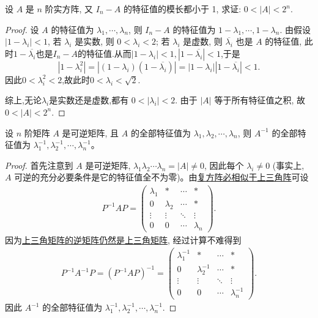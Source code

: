 \documentclass[../../main.tex]{subfiles}
\begin{document}
\begin{example}
设 \( A \) 是 \( n \) 阶实方阵, 又 \( I_n - A \) 的特征值的模长都小于 1, 求证: \( 0 < |A| < 2^n \).
\end{example}
\begin{proof}
设 \( A \) 的特征值为 \( \lambda_1, \cdots, \lambda_n \), 则 \( I_n - A \) 的特征值为 \( 1 - \lambda_1, \cdots, 1 - \lambda_n \).
由假设 \( |1 - \lambda_i| < 1 \), 若 \( \lambda_i \) 是实数, 则 \( 0 < \lambda_i < 2 \); 若 \( \lambda_i \) 是虚数, 则 \( \overline{\lambda_i} \) 也是 \( A \) 的特征值, 此时$1-\overline{\lambda_i}$也是$I_n-A$的特征值.从而$|1-\lambda_i|<1,|1-\overline{\lambda_i}|<1$,于是
\[|1-\lambda_i^2|=|(1-\lambda_i)(1-\overline{\lambda_i})|=|1-\lambda_i||1-\overline{\lambda_i}|<1.\]
因此$0<\lambda_i^2<2$,故此时$0<\lambda_i<\sqrt{2}$.

综上,无论$\lambda_i$是实数还是虚数,都有 \( 0 < |\lambda_i| < 2 \). 由于 \( |A| \) 等于所有特征值之积, 故 \( 0 < |A| < 2^n \).
\end{proof}

\begin{proposition}[逆矩阵的特征值]\label{proposition:逆矩阵的特征值}
设 $n$ 阶矩阵 $A$ 是可逆矩阵, 且 $A$ 的全部特征值为 $\lambda_1, \lambda_2, \cdots, \lambda_n$, 则 $A^{-1}$ 的全部特征值为 $\lambda_1^{-1}, \lambda_2^{-1}, \cdots, \lambda_n^{-1}$。
\end{proposition}
\begin{proof}
首先注意到 $A$ 是可逆矩阵, $\lambda_1 \lambda_2 \cdots \lambda_n = |A| \neq 0$, 因此每个 $\lambda_i \neq 0$ (事实上, $A$ 可逆的充分必要条件是它的特征值全不为零)。由\hyperref[theorem:复方阵必相似于上三角阵]{复方阵必相似于上三角阵}可设
\begin{align*}
P^{-1}AP = \begin{pmatrix}
\lambda_1 & * & \cdots & * \\
0 & \lambda_2 & \cdots & * \\
\vdots & \vdots & \ddots & \vdots \\
0 & 0 & \cdots & \lambda_n
\end{pmatrix}.
\end{align*}
因为\hyperref[proposition:上三角阵性质]{上三角矩阵的逆矩阵仍然是上三角矩阵}, 经过计算不难得到
\begin{align*}
P^{-1}A^{-1}P = (P^{-1}AP)^{-1} 
= \begin{pmatrix}
\lambda_1^{-1} & * & \cdots & * \\
0 & \lambda_2^{-1} & \cdots & * \\
\vdots & \vdots & \ddots & \vdots \\
0 & 0 & \cdots & \lambda_n^{-1}
\end{pmatrix}.
\end{align*}
因此 $A^{-1}$ 的全部特征值为 $\lambda_1^{-1}, \lambda_2^{-1}, \cdots, \lambda_n^{-1}$.
\end{proof}
\end{document}
